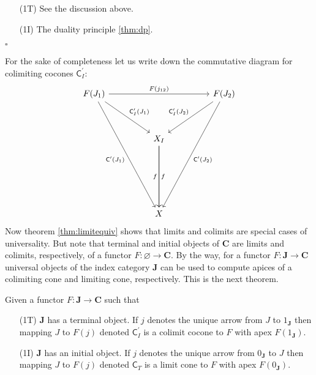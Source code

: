 \begin{prf}
\begin{enumerate}
\item[(1T)]
See the discussion above.
\item[(1I)]
The duality principle \ref{thm:dp}.
\end{enumerate}
\phantom{proven}
\hfill
$\square$
\end{prf}
For the sake of completeness let us write down the commutative diagram for colimiting cocones $\mathsf{C}_{I}^{\prime}$:
\[
\begin{tikzcd}[sep=huge]
  F(J_{1})
  \arrow{rr}{F(j_{12})}
  \arrow{dr}{\mathsf{C}_{I}^{\prime}(J_{1})}
  \arrow[swap]{dddr}{\mathsf{C}^{\prime}(J_{1})}
  &
  &
  F(J_{2})
  \arrow{dddl}{\mathsf{C}^{\prime}(J_{2})}
  \arrow[swap]{dl}{\mathsf{C}_{I}^{\prime}(J_{2})}
  \\
  &
  X_{I}
  \arrow{dd}{f}
  \arrow[swap]{dd}{f}
  &
  \\
  \\
  &
  X
  &
\end{tikzcd}
\]
Now theorem \ref{thm:limitequiv} shows that limits and colimits are special cases of universality. But note that terminal and initial objects of $\mathbf{C}$ are limits and colimits, respectively, of a functor $F \colon \varnothing \rightarrow \mathbf{C}$. By the way, for a functor $F \colon \mathbf{J} \rightarrow \mathbf{C}$ universal objects of the index category $\mathbf{J}$ can be used to compute apices of a colimiting cone and limiting cone, respectively. This is the next theorem.
\\
\begin{thm}
\label{thm:limonuniob}
Given a functor $F \colon \mathbf{J} \rightarrow \mathbf{C}$ such that
\begin{enumerate}
\item[(1T)]
$\mathbf{J}$ has a terminal object. If $j$ denotes the unique arrow from $J$ to $1_{\mathbf{J}}$ then mapping $J$ to $F(j)$ denoted $\mathsf{C}_{I}^{\prime}$ is a colimit cocone to $F$ with apex $F(1_{\mathbf{J}})$.
\item[(1I)]
$\mathbf{J}$ has an initial object. If $j$ denotes the unique arrow from $0_{\mathbf{J}}$ to $J$ then mapping $J$ to $F(j)$ denoted $\mathsf{C}_{T}$ is a limit cone to $F$ with apex $F(0_{\mathbf{J}})$.
\end{enumerate}
\end{thm}
